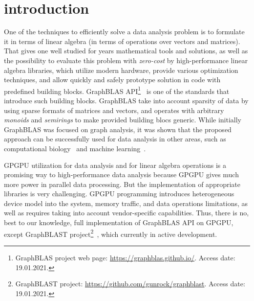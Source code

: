 \section{introduction}


One of the techniques to efficiently solve a data analysis problem is to formulate it in terms of linear algebra (in terms of operations over vectors and matrices).
That gives one well studied for years mathematical tools and solutions, as well as the possibility to evaluate this problem with \textit{zero-cost} by high-performance linear algebra libraries, which utilize modern hardware, provide various optimization techniques, and allow quickly and safely prototype solution in code with predefined building blocks.
GraphBLAS API\footnote{GraphBLAS project web page: \url{https://graphblas.github.io/}. Access date: 19.01.2021.}~\cite{7761646} is one of the standards that introduce such building blocks.
GraphBLAS take into account sparsity of data by using sparse formats of matrices and vectors, and operates with arbitrary \textit{monoids} and \textit{semirings} to make provided building blocs generic.
While initially GraphBLAS was focused on graph analysis, it was shown that the proposed approach can be successfully used for data analysis in other areas, such as computational biology~\cite{10.5555/3433701.3433800} and machine learning~\cite{8091098}. 

GPGPU utilization for data analysis and for linear algebra operations is a promising way to high-performance data analysis because GPGPU gives much more power in parallel data processing.
But the implementation of appropriate libraries is very challenging.
GPGPU programming introduces heterogeneous device model into the system, memory traffic, and data operations limitations, as well as requires taking into account vendor-specific capabilities.
Thus, there is no, best to our knowledge, full implementation of GraphBLAS API on GPGPU, except GraphBLAST project\footnote{GraphBLAST project: \url{https://github.com/gunrock/graphblast}. Access date: 19.01.2021.}~\cite{yang2019graphblast}, which currently in active development.


